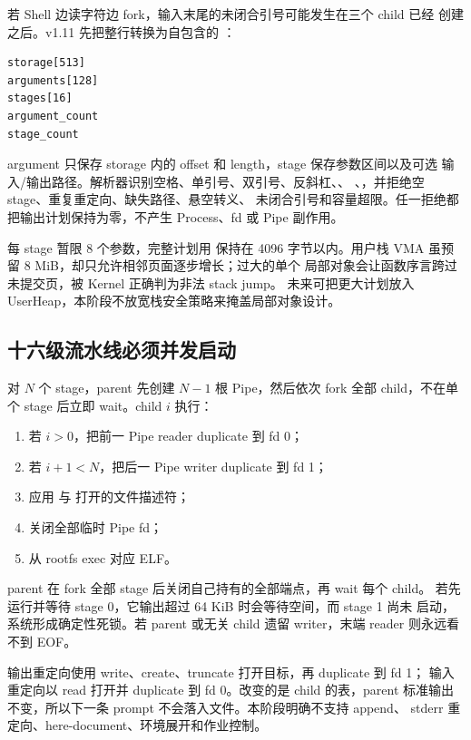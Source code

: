 若 Shell 边读字符边 fork，输入末尾的未闭合引号可能发生在三个 child 已经
创建之后。v1.11 先把整行转换为自包含的
：

\begin{verbatim}
storage[513]
arguments[128]
stages[16]
argument_count
stage_count
\end{verbatim}

argument 只保存 storage 内的 offset 和 length，stage 保存参数区间以及可选
输入/输出路径。解析器识别空格、单引号、双引号、反斜杠、\code{|}、
\code{<}、\code{>}，并拒绝空 stage、重复重定向、缺失路径、悬空转义、
未闭合引号和容量超限。任一拒绝都把输出计划保持为零，不产生 Process、fd
或 Pipe 副作用。

每 stage 暂限 8 个参数，完整计划用  保持在 4096
字节以内。用户栈 VMA 虽预留 8 MiB，却只允许相邻页面逐步增长；过大的单个
局部对象会让函数序言跨过未提交页，被 Kernel 正确判为非法 stack jump。
未来可把更大计划放入 UserHeap，本阶段不放宽栈安全策略来掩盖局部对象设计。

\subsection{十六级流水线必须并发启动}

对 \(N\) 个 stage，parent 先创建 \(N-1\) 根 Pipe，然后依次 fork 全部
child，不在单个 stage 后立即 wait。child \(i\) 执行：

\begin{enumerate}[label=\arabic*.]
  \item 若 \(i>0\)，把前一 Pipe reader duplicate 到 fd 0；
  \item 若 \(i+1<N\)，把后一 Pipe writer duplicate 到 fd 1；
  \item 应用 \code{<} 与 \code{>} 打开的文件描述符；
  \item 关闭全部临时 Pipe fd；
  \item 从 rootfs exec 对应  ELF。
\end{enumerate}

parent 在 fork 全部 stage 后关闭自己持有的全部端点，再 wait 每个 child。
若先运行并等待 stage 0，它输出超过 64 KiB 时会等待空间，而 stage 1 尚未
启动，系统形成确定性死锁。若 parent 或无关 child 遗留 writer，末端 reader
则永远看不到 EOF。

输出重定向使用 write、create、truncate 打开目标，再 duplicate 到 fd 1；
输入重定向以 read 打开并 duplicate 到 fd 0。改变的是 child 的表，parent
标准输出不变，所以下一条 prompt 不会落入文件。本阶段明确不支持 append、
stderr 重定向、here-document、环境展开和作业控制。

